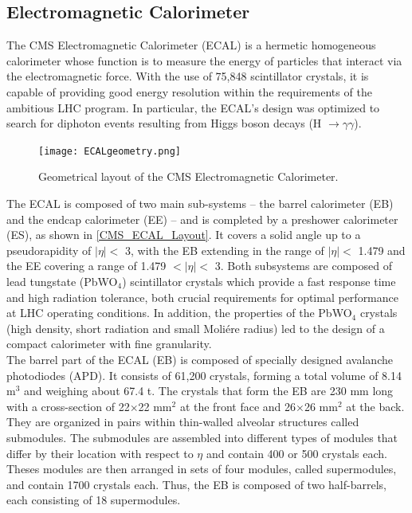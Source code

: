 \subsection{Electromagnetic Calorimeter}
The CMS Electromagnetic Calorimeter (ECAL) is a hermetic homogeneous calorimeter whose function is to measure the energy of particles that interact via the electromagnetic force. With the use of 75,848 scintillator crystals, it is capable of providing good energy resolution within the requirements of the ambitious LHC program. In particular, the ECAL's design was optimized to search for diphoton events resulting from Higgs boson decays (H $\rightarrow \gamma \gamma$).\\ 

\begin{figure}[tb]
\begin{center}
\texttt{[image: ECALgeometry.png]} 
\caption{Geometrical layout of the CMS Electromagnetic Calorimeter\cite{CMSLHC}.}
\label{CMS_ECAL_Geometry} 
\hspace{4em}
\end{center}
\end{figure}

The ECAL is composed of two main sub-systems -- the barrel calorimeter (EB) and the endcap calorimeter (EE) -- and is completed by a preshower calorimeter (ES), as shown in \autoref{CMS_ECAL_Layout}. It covers a solid angle up to a pseudorapidity of $|\eta| <$ 3, with the EB extending in the range of $|\eta| <$ 1.479 and the EE covering a range of  1.479 $< |\eta| <$ 3. Both subsystems are composed of lead tungstate (PbWO$_4$) scintillator crystals which provide a fast response time and high radiation tolerance, both crucial requirements for optimal performance at LHC operating conditions. In addition, the properties of the PbWO$_4$ crystals (high density, short radiation and small Moli\'ere radius) led to the design of a compact calorimeter with fine granularity.\\

The barrel part of the ECAL (EB) is composed of specially designed avalanche photodiodes (APD). It consists of 61,200 crystals, forming a total volume of 8.14 m$^3$ and weighing about 67.4 t. The crystals that form the EB are 230 mm long with a cross-section of 22$\times$22 mm$^2$ at the front face and 26$\times$26 mm$^2$ at the back. They are organized in pairs within thin-walled alveolar structures called submodules. The submodules are assembled into different types of modules that differ by their location with respect to $\eta$ and contain 400 or 500 crystals each. Theses modules are then arranged in sets of four modules, called supermodules, and contain 1700 crystals each. Thus, the EB is composed of two half-barrels, each consisting of 18 supermodules.\\

